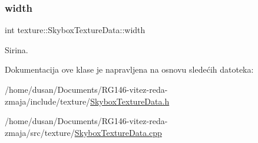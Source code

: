 \subsubsection{\texorpdfstring{width}{width}}
{\footnotesize\ttfamily int texture\+::\+Skybox\+Texture\+Data\+::width\hspace{0.3cm}{\ttfamily [private]}}



Sirina. 



Dokumentacija ove klase je napravljena na osnovu sledećih datoteka\+:\begin{DoxyCompactItemize}
\item 
/home/dusan/\+Documents/\+R\+G146-\/vitez-\/reda-\/zmaja/include/texture/\hyperlink{SkyboxTextureData_8h}{Skybox\+Texture\+Data.\+h}\item 
/home/dusan/\+Documents/\+R\+G146-\/vitez-\/reda-\/zmaja/src/texture/\hyperlink{SkyboxTextureData_8cpp}{Skybox\+Texture\+Data.\+cpp}\end{DoxyCompactItemize}

